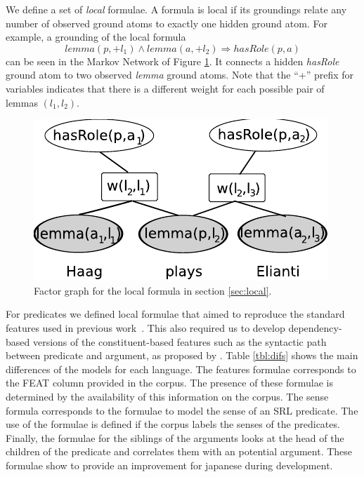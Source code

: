 
We define a set of \emph{local} formulae. A formula is local if its groundings 
relate any number of observed ground atoms to exactly one hidden ground atom.  
For example, a grounding of the local formula \[lemma(p,+l_1) \wedge 
lemma(a,+l_2) \Rightarrow hasRole(p,a)\]
can be seen in the Markov Network of Figure \ref{fig:local2}. It connects a 
hidden \emph{hasRole} ground atom to two observed \emph{lemma} ground atoms.  
Note that the ``+'' prefix for variables indicates that there is a different 
weight for each possible pair of lemmas $(l_1,l_2)$.

\begin{figure}
\begin{center}
    \includegraphics[scale=.70]{LocalFormula2}
\end{center}
\caption{Factor graph for the local formula in section \ref{sec:local}.}
\label{fig:local2}
\end{figure}

For predicates we defined local formulae that aimed to reproduce the standard 
features used in previous work~\citep{xue04calibrating}.  This also required us 
to develop dependency-based versions of the constituent-based features such as 
the syntactic path between predicate and argument, as proposed by 
\citet{xue04calibrating}. Table \ref{tbl:difs} shows the main differences of the 
models for each language. The features formulae corresponds to the FEAT column 
provided in the corpus. The presence of these formulae is determined by the 
availability of this information on the corpus. The sense formula corresponds to 
the formulae to model the sense of an SRL predicate. The use of the formulae is 
defined if the corpus labels the senses of the predicates. Finally, the formulae 
for the siblings of the arguments looks at the head of the children of the 
predicate and correlates them with an potential argument. These formulae show to 
provide an improvement for japanese during development. 

